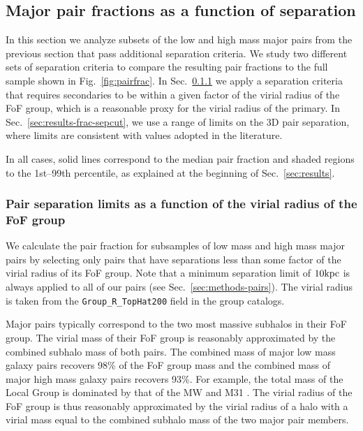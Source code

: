 \documentclass[twocolumn]{aastex631}
\begin{document}
\subsection{Major pair fractions as a function of separation}\label{sec:results-frac-cuts}
    In this section we analyze subsets of the low and high mass major pairs from the previous section that pass additional separation criteria. 
    We study two different sets of separation criteria to compare the resulting pair fractions to the full sample shown in Fig.~\ref{fig:pairfrac}.
    In  Sec.~\ref{sec:results-frac-vircut} we apply a separation criteria that requires secondaries to be within a given factor of the virial radius of the FoF group, which is a reasonable proxy for the virial radius of the primary. 
    In Sec.~\ref{sec:results-frac-sepcut}, we use a range of limits on the 3D pair separation, where limits are consistent with values adopted in the literature. 
    
    In all cases, solid lines correspond to the median pair fraction and shaded regions to the 1st--99th percentile, as explained at the beginning of Sec.~\ref{sec:results}. 

\subsubsection{Pair separation limits as a function of the virial radius of the FoF group}\label{sec:results-frac-vircut}
    We calculate the pair fraction for subsamples of low mass and high mass major pairs by selecting only pairs that have separations less than some factor of the virial radius of its FoF group. 
    Note that a minimum separation limit of $10\mathrm{kpc}$ is always applied to all of our pairs (see Sec.~\ref{sec:methods-pairs}). 
    The virial radius is taken from the \texttt{Group\_R\_TopHat200} field in the group catalogs. 
   
    Major pairs typically correspond to the two most massive subhalos in their FoF group. 
    The virial mass of their FoF group is reasonably approximated by the combined subhalo mass of both pairs.
    The combined mass of major low mass galaxy pairs recovers 98\% of the FoF group mass and the combined mass of major high mass galaxy pairs recovers 93\%. 
    For example, the total mass of the Local Group is dominated by that of the MW and M31 \citep[e.g., ][]{Chamberlain2023}. 
    The virial radius of the FoF group is thus reasonably approximated by the virial radius of a halo with a virial mass equal to the combined subhalo mass of the two major pair members. %
    
\end{document}
